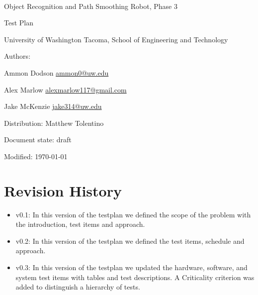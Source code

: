\documentclass[english,12pt]{article}
\begin{document}
\begin{center}

\thispagestyle{empty}

$ $

\vspace{250pt}

\begin{bfseries}

{\Large Object Recognition and Path Smoothing Robot, Phase 3}

{\Huge Test Plan}


\end{bfseries}

\vspace{180pt}

University of Washington Tacoma, School of Engineering and Technology


\vspace{12pt}

Authors: 

Ammon Dodson \href{mailto:ammon0@uw.edu}{ammon0@uw.edu} 

Alex Marlow \href{mailto:alexmarlow117@gmail.com}{alexmarlow117@gmail.com} 

Jake McKenzie \href{mailto:jake314@uw.edu}{jake314@uw.edu}

Distribution: Matthew Tolentino

Document state: draft

Modified: \today

\end{center}

\newpage


\tableofcontents

\newpage


\section{Revision History}

\begin{itemize}
	\item v0.1: In this version of the testplan we defined the  
    scope of the problem with the introduction, test items and 
    approach.
    \item v0.2: In this version of the testplan we defined the  
    test items, schedule and approach.
    \item v0.3: In this version of the testplan we updated 
    the hardware, software, and system test items with 
    tables and test descriptions. A Criticality criterion 
    was added to distinguish a hierarchy of tests. 
\end{itemize}
\end{document}
